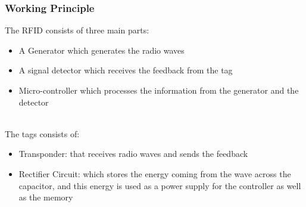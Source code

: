 \subsubsection{Working Principle}

The RFID consists of three main parts:
\begin{itemize}
		\item A Generator which generates the radio waves
		\item A signal detector which receives the feedback from the tag
		\item Micro-controller which processes the information from the generator and the detector\\
		\\
	\end{itemize}
The tags consists of:
\begin{itemize}
	\item Transponder: that receives radio waves and sends the feedback
	\item Rectifier Circuit: which stores the energy coming from the wave across the capacitor, and this energy is used as a power supply for the controller as well as the memory
\end{itemize}

